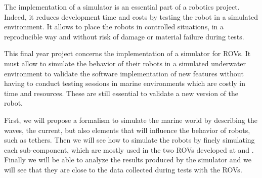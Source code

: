 The implementation of a simulator is an essential part of a robotics project. Indeed, it reduces development time and costs by testing the robot in a simulated environment. It allows to place the robots in controlled situations, in a reproducible way and without risk of damage or material failure during tests.

This final year project concerns the implementation of a simulator for \forssea{} \gls{ROV}s. It must allow to simulate the behavior of their robots in a simulated underwater environment to validate the software implementation of new features without having to conduct testing sessions in marine environments which are costly in time and resources. These are still essential to validate a new version of the robot.

First, we will propose a formalism to simulate the marine world by describing the waves, the current, but also elements that will influence the behavior of robots, such as tethers. Then we will see how to simulate the robots by finely simulating each sub-component, which are mostly used in the two \gls{ROV}s developed at \forssea{} \argos{} and \atoll{}. Finally we will be able to analyze the results produced by the simulator and we will see that they are close to the data collected during tests with the \gls{ROV}s.
